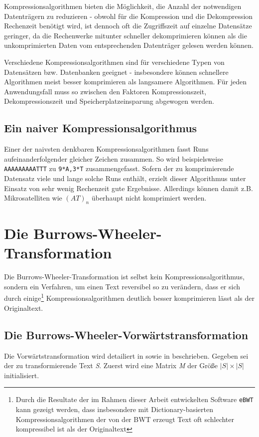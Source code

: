 \documentclass[ngerman,pdftex,paper=A4,DIV=calc,titlepage,12pt]{scrartcl}
\newtheorem[L]{boxedDefinition}{Definition}
\begin{document}
Kompressionsalgorithmen bieten die Möglichkeit, die Anzahl der notwendigen Datenträgern zu reduzieren - obwohl für die Kompression und die Dekompression Rechenzeit benötigt wird, ist dennoch oft die Zugriffszeit auf einzelne Datensätze geringer, da die Rechenwerke mitunter schneller dekomprimieren können als die unkomprimierten Daten vom entsprechenden Datenträger gelesen werden können.

Verschiedene Kompressionsalgorithmen sind für verschiedene Typen von Datensätzen bzw. Datenbanken geeignet - insbesondere können schnellere Algorithmen meist besser komprimieren als langsamere Algorithmen. Für jeden Anwendungsfall muss so zwischen den Faktoren Kompressionszeit, Dekompressionszeit und Speicherplatzeinsparung abgewogen werden.
\subsection{Ein naiver Kompressionsalgorithmus}
Einer der naivsten denkbaren Kompressionsalgorithmen fasst Runs aufeinanderfolgender gleicher Zeichen zusammen.
So wird beispielsweise \texttt{AAAAAAAAATTT} zu \texttt{9*A,3*T} zusammengefasst. Sofern der zu komprimierende Datensatz viele und lange solche Runs enthält, erzielt dieser Algorithmus unter Einsatz von sehr wenig Rechenzeit gute Ergebnisse. Allerdings können damit z.B. Mikrosatelliten wie $(AT)_n$ überhaupt nicht komprimiert werden.
\section{Die Burrows-Wheeler-Transformation}
Die Burrows-Wheeler-Transformation ist selbst kein Kompressionsalgorithmus, sondern ein Verfahren, um einen Text reversibel so zu verändern, dass er sich durch einige\footnote{Durch die Resultate der im Rahmen dieser Arbeit entwickelten Software \texttt{eBWT} kann gezeigt werden, dass insbesondere mit Dictionary-basierten Kompressionsalgorithmen der von der BWT erzeugt Text oft schlechter kompressibel ist als der Originaltext} Kompressionsalgorithmen deutlich besser komprimieren lässt als der Originaltext.
\subsection{Die Burrows-Wheeler-Vorwärtstransformation}\label{ssec:transformation}
Die Vorwärtstransformation wird detailiert in \cite{Heun2003} sowie in \cite[Seite 2 - Algorithmus C]{burrows1994block} beschrieben.
Gegeben sei der zu transformierende Text \textit{S}. Zuerst wird eine Matrix \textit{M} der Größe $|S| \times |S|$ initialisiert.
\end{document}
